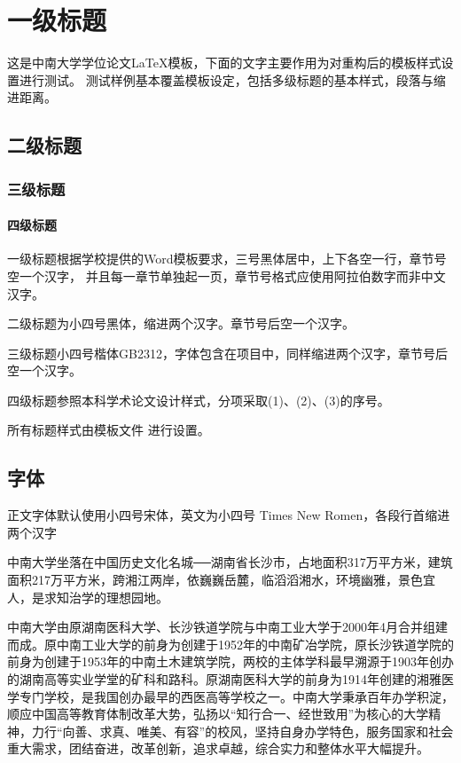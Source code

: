 \chapter{一级标题}

这是中南大学学位论文\LaTeX{}模板，下面的文字主要作用为对重构后的模板样式设置进行测试。
测试样例基本覆盖模板设定，包括多级标题的基本样式，段落与缩进距离。

\section{二级标题}

\subsection{三级标题}

\subsubsection{四级标题}

一级标题根据学校提供的Word模板要求，三号黑体居中，上下各空一行，章节号空一个汉字，
并且每一章节单独起一页，章节号格式应使用阿拉伯数字而非中文汉字。

二级标题为小四号黑体，缩进两个汉字。章节号后空一个汉字。

三级标题小四号楷体GB2312，字体包含在项目中，同样缩进两个汉字，章节号后空一个汉字。

四级标题参照本科学术论文设计样式，分项采取(1)、(2)、(3)的序号。

所有标题样式由模板文件  进行设置。

\section{字体}

正文字体默认使用小四号宋体，英文为小四号 Times New Romen，各段行首缩进两个汉字

中南大学坐落在中国历史文化名城──湖南省长沙市，占地面积317万平方米，建筑面积217万平方米，跨湘江两岸，依巍巍岳麓，临滔滔湘水，环境幽雅，景色宜人，是求知治学的理想园地。

中南大学由原湖南医科大学、长沙铁道学院与中南工业大学于2000年4月合并组建而成。原中南工业大学的前身为创建于1952年的中南矿冶学院，原长沙铁道学院的前身为创建于1953年的中南土木建筑学院，两校的主体学科最早溯源于1903年创办的湖南高等实业学堂的矿科和路科。原湖南医科大学的前身为1914年创建的湘雅医学专门学校，是我国创办最早的西医高等学校之一。中南大学秉承百年办学积淀，顺应中国高等教育体制改革大势，弘扬以“知行合一、经世致用”为核心的大学精神，力行“向善、求真、唯美、有容”的校风，坚持自身办学特色，服务国家和社会重大需求，团结奋进，改革创新，追求卓越，综合实力和整体水平大幅提升。

